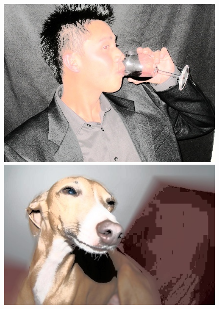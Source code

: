 \begin{appendices}
\begin{figure}[htb]
\begin{minipage}{0.19\textwidth}
\end{minipage}
\begin{minipage}{0.19\textwidth}
\includegraphics[width=\textwidth]{images/anomalien/HA/001608.jpg}
\end{minipage}
\begin{minipage}{0.19\textwidth}
\includegraphics[width=\textwidth]{images/anomalien/HA/003339.jpg}
\end{minipage}
\begin{minipage}{\textwidth}
\hspace{\textwidth}
\end{minipage}
\begin{minipage}{0.19\textwidth}

\end{minipage}
\end{figure}
\end{appendices}
